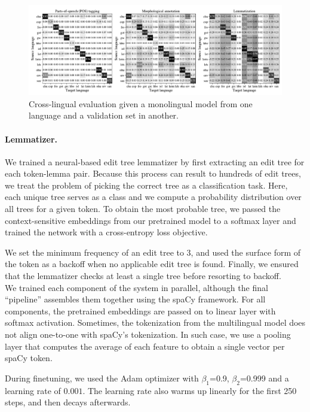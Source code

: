 \documentclass[11pt]{article}
\begin{document}
\begin{figure}[t]
\centering
\includegraphics[width=\textwidth]{figures/cross_lingual.pdf}
\caption{Cross-lingual evaluation given a monolingual model from one language and a validation set in another.}
\label{fig:cross_lingual}
\end{figure}


\paragraph{Lemmatizer.} 
We trained a neural-based edit tree lemmatizer \cite{muller-etal-2015-joint} by first extracting an edit tree for each token-lemma pair.
Because this process can result to hundreds of edit trees, we treat the problem of picking the correct tree as a classification task.
Here, each unique tree serves as a class and we compute a probability distribution over all trees for a given token.
To obtain the most probable tree, we passed the context-sensitive embeddings from our pretrained model to a softmax layer and trained the network with a cross-entropy loss objective.

We set the minimum frequency of an edit tree to 3, and used the surface form of the token as a backoff when no applicable edit tree is found.
Finally, we ensured that the lemmatizer checks at least a single tree before resorting to backoff. \\

\noindent We trained each component of the system in parallel, although the final ``pipeline'' assembles them together using the spaCy framework.
For all components, the pretrained embeddings are passed on to linear layer with softmax activation.
Sometimes, the tokenization from the multilingual model does not align one-to-one with spaCy's tokenization.
In such case, we use a pooling layer that computes the average of each feature to obtain a single vector per spaCy token.

During finetuning, we used the Adam optimizer with $\beta_1$=0.9, $\beta_2$=0.999 and a learning rate of $0.001$.
The learning rate also warms up linearly for the first 250 steps, and then decays afterwards.
\end{document}
